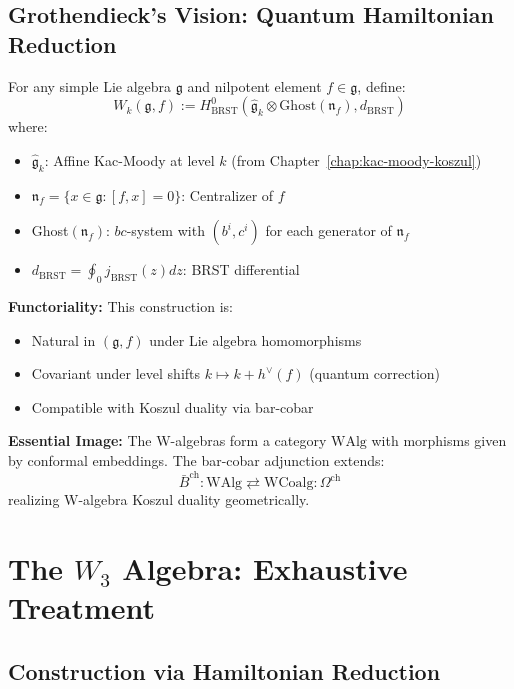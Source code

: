 \subsection{Grothendieck's Vision: Quantum Hamiltonian Reduction}

\begin{principle}
For any simple Lie algebra $\mathfrak{g}$ and nilpotent element $f \in \mathfrak{g}$, define:
$$W_k(\mathfrak{g}, f) := H^0_{\text{BRST}}\left(\widehat{\mathfrak{g}}_k \otimes \text{Ghost}(\mathfrak{n}_f), d_{\text{BRST}}\right)$$
where:
\begin{itemize}
\item $\widehat{\mathfrak{g}}_k$: Affine Kac-Moody at level $k$ (from Chapter~\ref{chap:kac-moody-koszul})
\item $\mathfrak{n}_f = \{x \in \mathfrak{g} : [f,x] = 0\}$: Centralizer of $f$
\item Ghost$(\mathfrak{n}_f)$: $bc$-system with $(b^i, c^i)$ for each generator of $\mathfrak{n}_f$
\item $d_{\text{BRST}} = \oint_0 j_{\text{BRST}}(z) dz$: BRST differential
\end{itemize}

\textbf{Functoriality:} This construction is:
\begin{itemize}
\item Natural in $(\mathfrak{g}, f)$ under Lie algebra homomorphisms
\item Covariant under level shifts $k \mapsto k + h^\vee(f)$ (quantum correction)
\item Compatible with Koszul duality via bar-cobar
\end{itemize}

\textbf{Essential Image:} The W-algebras form a category $\text{WAlg}$ with morphisms given by conformal embeddings. The bar-cobar adjunction extends:
$$\bar{B}^{\text{ch}}: \text{WAlg} \rightleftarrows \text{WCoalg}: \Omega^{\text{ch}}$$
realizing W-algebra Koszul duality geometrically.
\end{principle}

\section{The $W_3$ Algebra: Exhaustive Treatment}

\subsection{Construction via Hamiltonian Reduction}

